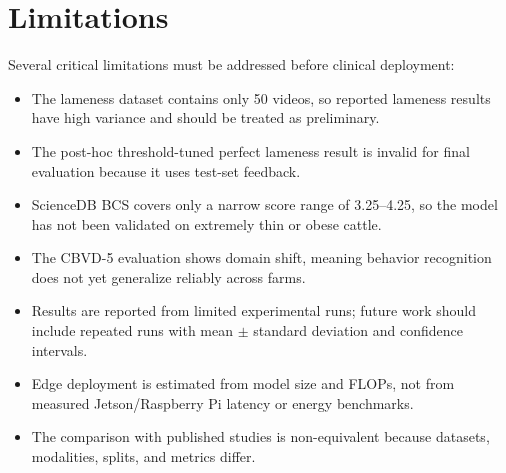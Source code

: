 \section{Limitations}
Several critical limitations must be addressed before clinical deployment:
\begin{itemize}
    \item The lameness dataset contains only 50 videos, so reported lameness results have high variance and should be treated as preliminary.
    \item The post-hoc threshold-tuned perfect lameness result is invalid for final evaluation because it uses test-set feedback.
    \item ScienceDB BCS covers only a narrow score range of 3.25--4.25, so the model has not been validated on extremely thin or obese cattle.
    \item The CBVD-5 evaluation shows domain shift, meaning behavior recognition does not yet generalize reliably across farms.
    \item Results are reported from limited experimental runs; future work should include repeated runs with mean $\pm$ standard deviation and confidence intervals.
    \item Edge deployment is estimated from model size and FLOPs, not from measured Jetson/Raspberry Pi latency or energy benchmarks.
    \item The comparison with published studies is non-equivalent because datasets, modalities, splits, and metrics differ.
\end{itemize}

